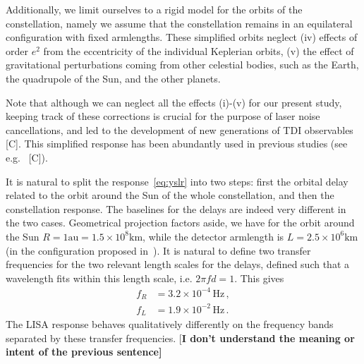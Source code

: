 \documentclass[aps,showpacs,twocolumn,
prd,superscriptaddress,nofootinbib]{revtex4-1}
\newcommand{\Hz}{\,\mathrm{Hz}}
\newcommand{\SM}[1]{{\color{Red} #1}}
\newcommand{\jgb}[1]{{\color{DarkGreen} #1}}
\begin{document}
Additionally, we limit ourselves to a rigid model for the orbits of the constellation, namely we assume that the constellation remains in an equilateral configuration with fixed armlengths. These simplified orbits neglect (iv) effects of order $e^{2}$ from the eccentricity of the individual Keplerian orbits, (v) the effect of gravitational perturbations coming from other celestial bodies, such as the Earth, the quadrupole of the Sun, and the other planets. 

Note that although we can neglect all the effects (i)-(v) for our present study, keeping track of these corrections is crucial for the purpose of laser noise cancellations, and led to the development of new generations of TDI observables~\cite{} \SM{[C]}. This simplified response has been abundantly used in previous studies (see e.g.~\cite{} \SM{[C]}).

It is natural to split the response~\eqref{eq:yslr} into two steps: first the orbital delay related to the orbit around the Sun of the whole constellation, and then the constellation response. The baselines for the delays are indeed very different in the two cases. Geometrical projection factors aside, we have for the orbit around the Sun $R=1\text{au}=1.5\times 10^{8} \text{km}$, while the detector armlength is $L=2.5\times 10^{6}\text{km}$ (in the configuration proposed in~\cite{LISA17}). It is natural to define two transfer frequencies for the two relevant length scales for the delays, defined such that a wavelength fits within this length scale, i.e. $2\pi f d = 1$. This gives
\begin{subequations}\label{eq:transferfrequencies}
\begin{align}
	f_{R} &= 3.2\times10^{-4}\Hz \,,\\
	f_{L} &= 1.9\times 10^{-2}\Hz \,.
\end{align}
\end{subequations}
The LISA response behaves qualitatively differently on the frequency bands separated by these transfer frequencies. \jgb{[\bf I don't understand the meaning or intent of the previous sentence]}
\end{document}
